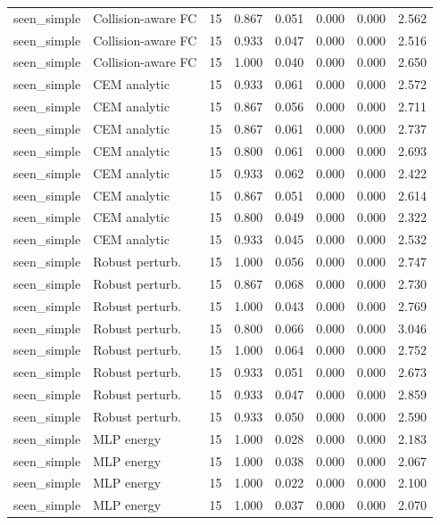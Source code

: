 {\begin{longtable}{llrrrrrr}
seen\_simple & Collision-aware FC & 15 & 0.867 & 0.051 & 0.000 & 0.000 & 2.562 \\
seen\_simple & Collision-aware FC & 15 & 0.933 & 0.047 & 0.000 & 0.000 & 2.516 \\
seen\_simple & Collision-aware FC & 15 & 1.000 & 0.040 & 0.000 & 0.000 & 2.650 \\
seen\_simple & CEM analytic & 15 & 0.933 & 0.061 & 0.000 & 0.000 & 2.572 \\
seen\_simple & CEM analytic & 15 & 0.867 & 0.056 & 0.000 & 0.000 & 2.711 \\
seen\_simple & CEM analytic & 15 & 0.867 & 0.061 & 0.000 & 0.000 & 2.737 \\
seen\_simple & CEM analytic & 15 & 0.800 & 0.061 & 0.000 & 0.000 & 2.693 \\
seen\_simple & CEM analytic & 15 & 0.933 & 0.062 & 0.000 & 0.000 & 2.422 \\
seen\_simple & CEM analytic & 15 & 0.867 & 0.051 & 0.000 & 0.000 & 2.614 \\
seen\_simple & CEM analytic & 15 & 0.800 & 0.049 & 0.000 & 0.000 & 2.322 \\
seen\_simple & CEM analytic & 15 & 0.933 & 0.045 & 0.000 & 0.000 & 2.532 \\
seen\_simple & Robust perturb. & 15 & 1.000 & 0.056 & 0.000 & 0.000 & 2.747 \\
seen\_simple & Robust perturb. & 15 & 0.867 & 0.068 & 0.000 & 0.000 & 2.730 \\
seen\_simple & Robust perturb. & 15 & 1.000 & 0.043 & 0.000 & 0.000 & 2.769 \\
seen\_simple & Robust perturb. & 15 & 0.800 & 0.066 & 0.000 & 0.000 & 3.046 \\
seen\_simple & Robust perturb. & 15 & 1.000 & 0.064 & 0.000 & 0.000 & 2.752 \\
seen\_simple & Robust perturb. & 15 & 0.933 & 0.051 & 0.000 & 0.000 & 2.673 \\
seen\_simple & Robust perturb. & 15 & 0.933 & 0.047 & 0.000 & 0.000 & 2.859 \\
seen\_simple & Robust perturb. & 15 & 0.933 & 0.050 & 0.000 & 0.000 & 2.590 \\
seen\_simple & MLP energy & 15 & 1.000 & 0.028 & 0.000 & 0.000 & 2.183 \\
seen\_simple & MLP energy & 15 & 1.000 & 0.038 & 0.000 & 0.000 & 2.067 \\
seen\_simple & MLP energy & 15 & 1.000 & 0.022 & 0.000 & 0.000 & 2.100 \\
seen\_simple & MLP energy & 15 & 1.000 & 0.037 & 0.000 & 0.000 & 2.070 \\

\end{longtable}}
